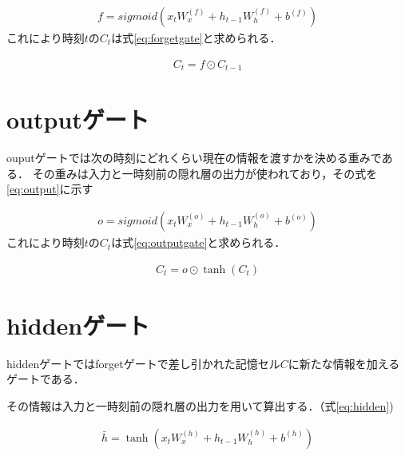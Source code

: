 \documentclass[a4j,11pt,report]{jsbook}
\begin{document}
\begin{equation}
  \label{eq:forget}
  \begin{split}
    f = sigmoid(x_{t}W_{x}^{(f)} + h_{t-1}W_{h}^{(f)} + b^{(f)})
  \end{split}
\end{equation}
これにより時刻$t$の$C_{t}$は式\ref{eq:forgetgate}と求められる．

\begin{equation}
  \label{eq:forgetgate}
  \begin{split}
    C_{t} = f \odot C_{t-1}
  \end{split}
\end{equation}


\section{outputゲート\label{sec:output}}
ouputゲートでは次の時刻にどれくらい現在の情報を渡すかを決める重みである．
その重みは入力と一時刻前の隠れ層の出力が使われており，その式を\ref{eq:output}に示す


\begin{equation}
  \label{eq:output}
  \begin{split}
    o = sigmoid(x_{t}W_{x}^{(o)} + h_{t-1}W_{h}^{(o)} + b^{(o)})
  \end{split}
\end{equation}
これにより時刻$t$の$C_{t}$は式\ref{eq:outputgate}と求められる．

\begin{equation}
  \label{eq:outputgate}
  \begin{split}
    C_{t} = o \odot \tanh(C_{t})
  \end{split}
\end{equation}

\section{hiddenゲート\label{sec:hidden}}

hiddenゲートではforgetゲートで差し引かれた記憶セル$C$に新たな情報を加えるゲートである．

その情報は入力と一時刻前の隠れ層の出力を用いて算出する．（式\ref{eq:hidden})


\begin{equation}
  \label{eq:hidden}
  \begin{split}
    \bar{h} = \tanh(x_{t}W_{x}^{(h)} + h_{t-1}W_{h}^{(h)} + b^{(h)})
  \end{split}
\end{equation}
\end{document}
